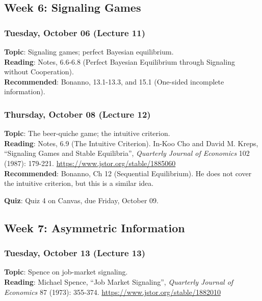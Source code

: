 \documentclass[
  letterpaper,
  DIV=11,
  numbers=noendperiod]{scrartcl}
\begin{document}
\subsection{Week 6: Signaling Games}\label{week-6-signaling-games}

\subsubsection{Tuesday, October 06 (Lecture
11)}\label{tuesday-october-06-lecture-11}

\textbf{Topic}: Signaling games; perfect Bayesian equilibrium.\\
\textbf{Reading}: Notes, 6.6-6.8 (Perfect Bayesian Equilibrium through
Signaling without Cooperation).\\
\textbf{Recommended}: Bonanno, 13.1-13.3, and 15.1 (One-sided incomplete
information).

\subsubsection{Thursday, October 08 (Lecture
12)}\label{thursday-october-08-lecture-12}

\textbf{Topic}: The beer-quiche game; the intuitive criterion.\\
\textbf{Reading}: Notes, 6.9 (The Intuitive Criterion). In-Koo Cho and
David M. Kreps, ``Signaling Games and Stable Equilibria'',
\emph{Quarterly Journal of Economics} 102 (1987): 179-221.
\url{https://www.jstor.org/stable/1885060}\\
\textbf{Recommended}: Bonanno, Ch 12 (Sequential Equilibrium). He does
not cover the intuitive criterion, but this is a similar idea.

\textbf{Quiz}: Quiz 4 on Canvas, due Friday, October 09.

\subsection{Week 7: Asymmetric
Information}\label{week-7-asymmetric-information}

\subsubsection{Tuesday, October 13 (Lecture
13)}\label{tuesday-october-13-lecture-13}

\textbf{Topic}: Spence on job-market signaling.\\
\textbf{Reading}: Michael Spence, ``Job Market Signaling'',
\emph{Quarterly Journal of Economics} 87 (1973): 355-374.
\url{https://www.jstor.org/stable/1882010}
\end{document}
